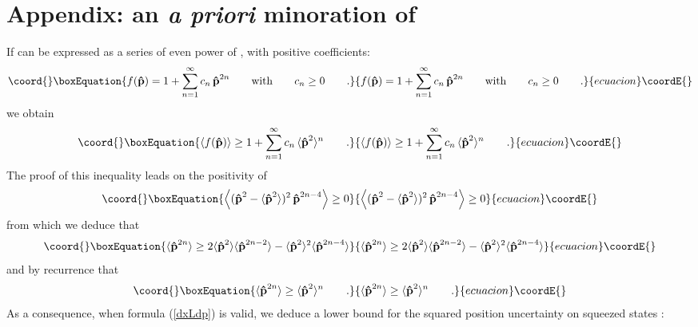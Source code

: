 \documentclass[a4paper,10pt]{article}
\providecommand{\x}{\mbox{\rm{\bf \^ x}}}
\providecommand{\p}{\mbox{\rm{\bf \^ p}}}
\begin{document}
\section{Appendix: an {\it a priori} minoration of \myHighlight{$\Delta\x$}\coordHE{}} If
\myHighlight{$f(\p)$}\coordHE{} can be expressed as a series of even power of \myHighlight{$\p$}\coordHE{}, with
positive coefficients:
\begin{equation}\coord{}\boxEquation{ f(\p)=1+\sum_{n=1}^\infty c_n\,\p^{2n}\qquad {\rm
with}\qquad c_n\geq0\qquad.
}{ f(\p)=1+\sum_{n=1}^\infty c_n\,\p^{2n}\qquad {\rm
with}\qquad c_n\geq0\qquad.
}{ecuacion}\coordE{}\end{equation} we obtain
\begin{equation}\coord{}\boxEquation{
\langle f(\p)\rangle\geq 1+\sum_{n=1}^\infty
c_n\,\langle\p^2\rangle^n \qquad.
}{
\langle f(\p)\rangle\geq 1+\sum_{n=1}^\infty
c_n\,\langle\p^2\rangle^n \qquad.
}{ecuacion}\coordE{}\end{equation} The proof of this inequality leads on the positivity of
\begin{equation}\coord{}\boxEquation{
\left\langle(\p^2-\langle\p^2\rangle)^2\,\p^{2n-4}\right\rangle\geq
0
}{
\left\langle(\p^2-\langle\p^2\rangle)^2\,\p^{2n-4}\right\rangle\geq
0
}{ecuacion}\coordE{}\end{equation} from which we deduce that
\begin{equation}\coord{}\boxEquation{
\langle\p^{2n}\rangle\geq
2\langle\p^2\rangle\langle\p^{2n-2}\rangle -
\langle\p^2\rangle^2\langle\p^{2n-4}\rangle
}{
\langle\p^{2n}\rangle\geq
2\langle\p^2\rangle\langle\p^{2n-2}\rangle -
\langle\p^2\rangle^2\langle\p^{2n-4}\rangle
}{ecuacion}\coordE{}\end{equation} and by recurrence that
\begin{equation}\coord{}\boxEquation{
\langle\p^{2n}\rangle \geq \langle\p^2\rangle^n\qquad.
}{
\langle\p^{2n}\rangle \geq \langle\p^2\rangle^n\qquad.
}{ecuacion}\coordE{}\end{equation} As a consequence, when formula (\ref{dxLdp}) is valid,
we deduce a lower bound for the squared position uncertainty on
squeezed states :
\end{document}
